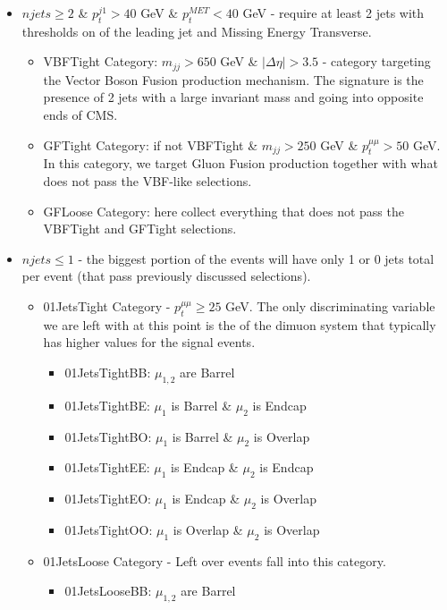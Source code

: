 \begin{itemize}
  \item $njets \ge 2$ \& $p_{t}^{j1} > 40$ GeV \& $p_{t}^{MET} < 40$ GeV - require at least 2 jets with thresholds on \pt of the leading jet and Missing Energy Transverse.
    \begin{itemize}
      \item VBFTight Category: $m_{jj} > 650$ GeV \& $|\Delta \eta| > 3.5$ - category targeting the Vector Boson Fusion production mechanism. The signature is the presence of 2 jets with a large invariant mass and going into opposite ends of CMS.
      \item GFTight Category: if not VBFTight \& $m_{jj} > 250$ GeV \& $p_{t}^{\mu\mu} > 50$ GeV. In this category, we target Gluon Fusion production together with what does not pass the VBF-like selections.
      \item GFLoose Category: here collect everything that does not pass the VBFTight and GFTight selections.
    \end{itemize}
  \item $njets \le 1$ - the biggest portion of the events will have only 1 or 0 jets total per event (that pass previously discussed selections).
    \begin{itemize}
      \item 01JetsTight Category - $p_t^{\mu\mu} \ge 25$ GeV. The only discriminating variable we are left with at this point is the \pt of the dimuon system that typically has higher values for the signal events.
        \begin{itemize}
          \item 01JetsTightBB: $\mu_{1,2}$ are Barrel
          \item 01JetsTightBE: $\mu_{1}$ is Barrel \& $\mu_2$ is Endcap
          \item 01JetsTightBO: $\mu_{1}$ is Barrel \& $\mu_2$ is Overlap
          \item 01JetsTightEE: $\mu_{1}$ is Endcap \& $\mu_2$ is Endcap
          \item 01JetsTightEO: $\mu_{1}$ is Endcap \& $\mu_2$ is Overlap
          \item 01JetsTightOO: $\mu_{1}$ is Overlap \& $\mu_2$ is Overlap
        \end{itemize}
      \item 01JetsLoose Category - Left over events fall into this category.
        \begin{itemize}
          \item 01JetsLooseBB: $\mu_{1,2}$ are Barrel

\end{itemize}
\end{itemize}
\end{itemize}
